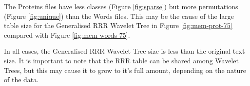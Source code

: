The Proteins files have less classes (Figure \ref{fig:sparse}) but more 
permutations (Figure \ref{fig:unique}) than the Words files. This may be the 
cause of the large table size for the Generalised RRR Wavelet Tree in Figure
\ref{fig:mem-prot-75} compared with Figure \ref{fig:mem-words-75}.

In all cases, the Generalised RRR Wavelet Tree size is less than the original
text size. It is important to note that the RRR table can be shared among
Wavelet Trees, but this may cause it to grow to it's full amount, depending
on the nature of the data.
